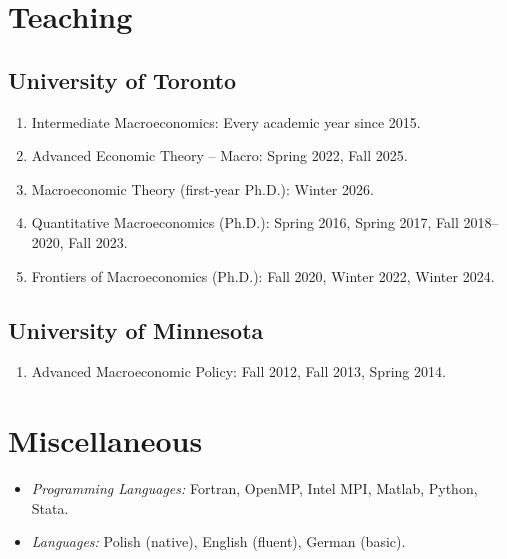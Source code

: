 \documentclass[letterpaper]{article}
\begin{document}
\section*{Teaching}

\subsection*{University of Toronto}
\begin{enumerate}
\item Intermediate Macroeconomics: Every academic year since 2015.
\item Advanced Economic Theory -- Macro: Spring 2022, Fall 2025.
\item Macroeconomic Theory (first-year Ph.D.): Winter 2026.
\item Quantitative Macroeconomics (Ph.D.): Spring 2016, Spring 2017, Fall 2018--2020, Fall 2023.
\item Frontiers of Macroeconomics (Ph.D.): Fall 2020, Winter 2022, Winter 2024.
\end{enumerate}

\subsection*{University of Minnesota}
\begin{enumerate}
\item Advanced Macroeconomic Policy: Fall 2012, Fall 2013, Spring 2014.
\end{enumerate}

\section*{Miscellaneous}
\begin{itemize}
\item \textit{Programming Languages:} Fortran, OpenMP, Intel MPI, Matlab, Python, Stata.
\item \textit{Languages:} Polish (native), English (fluent), German (basic).
\end{itemize}

\thispagestyle{finalpage}
\end{document}

